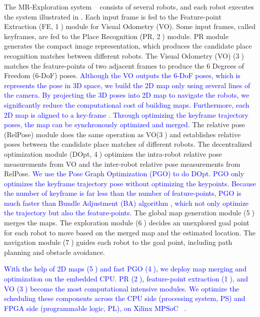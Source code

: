 The  MR-Exploration system  ~\cite{corah2019communication, cieslewski2018data} consists of several robots, and each robot executes the system illustrated in . Each input frame is fed to the Feature-point Extraction (FE, \textcircled{1}) module for Visual Odometry (VO). 
Some input frames, called keyframes, are fed to the Place Recognition (PR, \textcircled{2}) module.
PR module generates the compact image representation, which produces the candidate place recognition matches between different robots. 
The Visual Odometry (VO) (\textcircled{3}) matches the feature-points of two adjacent frames to produce the 6 Degrees of Freedom (6-DoF) poses. 
\textcolor{blue}{
Although the VO outputs the 6-DoF poses, which is represents the pose in 3D space, we build the 2D map only using several lines of the camera. 
By projecting the 3D poses into 2D map to navigate the robots, we significantly reduce the computational cost of building maps.
Furthermore, each 2D map is aligned to a key-frame \cite{ho2018virtual,sodhi2019online}.
Through optimizing the keyframe trajectory poses, the map can be synchronously optimized and merged.
}
The relative pose (RelPose) module does the same operation as VO(\textcircled{3}) and establishes relative poses between the candidate place matches of different robots. 
The decentralized optimization module (DOpt, \textcircled{4}) optimizes the intra-robot relative pose measurements from VO and the inter-robot relative pose measurements from RelPose. 
\textcolor{blue}{
We use the Pose Graph Optimization (PGO) \cite{Choudhary:2017e66} to do DOpt. 
PGO only optimizes the keyframe trajectory pose without optimizing the keypoints. 
Because the number of keyframe is far less than the number of feature-points, PGO is much faster than Bundle Adjustment (BA) algorithm \cite{wu2011multicore}, which not only optimize the trajectory but also the feature-points.
}
The global map generation module (\textcircled{5}) merges the maps. The exploration module (\textcircled{6}) decides an unexplored goal point for each robot to move based on the merged map and the estimated location. The navigation module (\textcircled{7}) guides each robot to the goal point, including path planning and obstacle avoidance.

\textcolor{blue}{
With the help of 2D maps (\textcircled{5}) and fast PGO (\textcircled{4}), we deploy map merging and optimization on the embedded CPU. 
PR (\textcircled{2}), feature-point extraction (\textcircled{1}), and VO (\textcircled{3}) become the most computational intensive modules. We optimize the scheduling these components across the CPU side (processing system, PS) and FPGA side (programmable logic, PL), on Xilinx MPSoC  ~\cite{MPSoC}.
}



